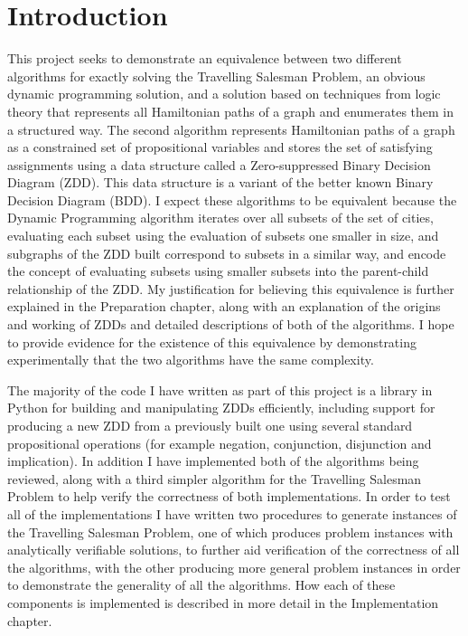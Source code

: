 \documentclass[12pt,a4paper,twoside,openright]{report}
\begin{document}
\chapter{Introduction}
This project seeks to demonstrate an equivalence between two different algorithms for exactly solving the Travelling Salesman Problem, an obvious dynamic programming solution, and a solution based on techniques from logic theory that represents all Hamiltonian paths of a graph and enumerates them in a structured way. The second algorithm represents Hamiltonian paths of a graph as a constrained set of propositional variables and stores the set of satisfying assignments using a data structure called a Zero-suppressed Binary Decision Diagram (ZDD)\cite{minatoZDDhist}. This data structure is a variant of the better known Binary Decision Diagram (BDD). I expect these algorithms to be equivalent because the Dynamic Programming algorithm iterates over all subsets of the set of cities, evaluating each subset using the evaluation of subsets one smaller in size, and subgraphs of the ZDD built correspond to subsets in a similar way, and encode the concept of evaluating subsets using smaller subsets into the parent-child relationship of the ZDD. My justification for believing this equivalence is further explained in the Preparation chapter, along with an explanation of the origins and working of ZDDs and detailed descriptions of both of the algorithms. I hope to provide evidence for the existence of this equivalence by demonstrating experimentally that the two algorithms have the same complexity. 

The majority of the code I have written as part of this project is a library in Python for building and manipulating ZDDs efficiently, including support for producing a new ZDD from a previously built one using several standard propositional operations (for example negation, conjunction, disjunction and implication). In addition I have implemented both of the algorithms being reviewed, along with a third simpler algorithm for the Travelling Salesman Problem to help verify the correctness of both implementations. In order to test all of the implementations I have written two procedures to generate instances of the Travelling Salesman Problem, one of which produces problem instances with analytically verifiable solutions, to further aid verification of the correctness of all the algorithms, with the other producing more general problem instances in order to demonstrate the generality of all the algorithms. How each of these components is implemented is described in more detail in the Implementation chapter.
\end{document}
